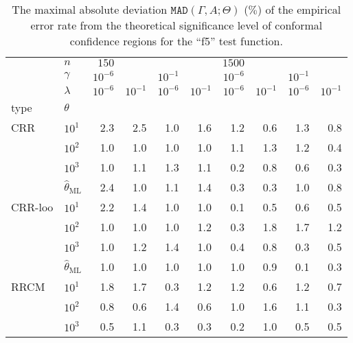 \documentclass[a4paper,14pt]{extarticle}
\begin{document}
\begin{table}
  \centering
  \caption{The maximal absolute deviation $\mathtt{MAD}(\Gamma, A; \Theta)$ ($\%$)
  of the empirical error rate from the theoretical significance level of conformal
  confidence regions for the ``f5'' test function.}
  \label{tab:nongaussian_f5_2d_cov_conf}
  \begin{tabular}{ll||rrrr|rrrr}
  \toprule
       & $n$ &     $150$  &          &          &          &     $1500$ &          &          &          \\\cline{2-2}
       & $\gamma$ & $10^{-6}$ &          & $10^{-1}$ &          & $10^{-6}$ &          & $10^{-1}$ &          \\\cline{2-2}
       & $\lambda$ & $10^{-6}$ & $10^{-1}$ & $10^{-6}$ & $10^{-1}$ & $10^{-6}$ & $10^{-1}$ & $10^{-6}$ & $10^{-1}$ \\\cline{2-2}
  type & $\theta$ &          &          &          &          &          &          &          &          \\
  \midrule
  CRR & $10^1$ &      2.3 &      2.5 &      1.0 &      1.6 &      1.2 &      0.6 &      1.3 &      0.8 \\
       & $10^2$ &      1.0 &      1.0 &      1.0 &      1.0 &      1.1 &      1.3 &      1.2 &      0.4 \\
       & $10^3$ &      1.0 &      1.1 &      1.3 &      1.1 &      0.2 &      0.8 &      0.6 &      0.3 \\
       & $\hat{\theta}_\text{ML}$ &      2.4 &      1.0 &      1.1 &      1.4 &      0.3 &      0.3 &      1.0 &      0.8 \\
  \midrule
  CRR-loo & $10^1$ &      2.2 &      1.4 &      1.0 &      1.0 &      0.1 &      0.5 &      0.6 &      0.5 \\
       & $10^2$ &      1.0 &      1.0 &      1.0 &      1.2 &      0.3 &      1.8 &      1.7 &      1.2 \\
       & $10^3$ &      1.0 &      1.2 &      1.4 &      1.0 &      0.4 &      0.8 &      0.3 &      0.5 \\
       & $\hat{\theta}_\text{ML}$ &      1.0 &      1.0 &      1.0 &      1.0 &      1.0 &      0.9 &      0.1 &      0.3 \\
  \midrule
  RRCM & $10^1$ &      1.8 &      1.7 &      0.3 &      1.2 &      1.2 &      0.6 &      1.2 &      0.7 \\
       & $10^2$ &      0.8 &      0.6 &      1.4 &      0.6 &      1.0 &      1.6 &      1.1 &      0.3 \\
       & $10^3$ &      0.5 &      1.1 &      0.3 &      0.3 &      0.2 &      1.0 &      0.5 &      0.5 \\

\end{tabular}
\end{table}
\end{document}
